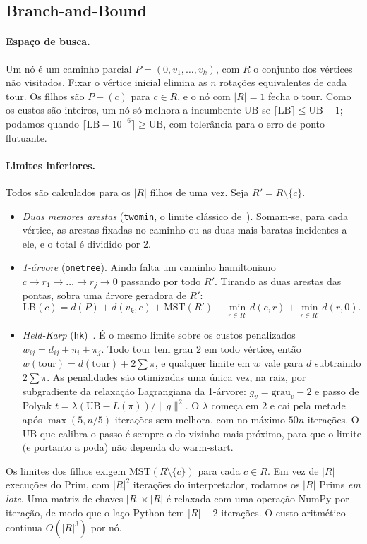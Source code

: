 \subsection{Branch-and-Bound}

\paragraph{Espaço de busca.} Um nó é um caminho parcial
$P=(0,v_1,\dots,v_k)$, com $R$ o conjunto dos vértices não visitados. Fixar o
vértice inicial elimina as $n$ rotações equivalentes de cada tour. Os filhos
são $P+(c)$ para $c\in R$, e o nó com $|R|=1$ fecha o tour. Como os custos
são inteiros, um nó só melhora a incumbente $\mathrm{UB}$ se
$\lceil \mathrm{LB}\rceil\le \mathrm{UB}-1$; podamos quando
$\lceil\mathrm{LB}-10^{-6}\rceil\ge\mathrm{UB}$, com tolerância para o erro
de ponto flutuante.

\paragraph{Limites inferiores.} Todos são calculados para os $|R|$ filhos de
uma vez. Seja $R'=R\setminus\{c\}$.
\begin{itemize}
  \item \emph{Duas menores arestas} (\texttt{twomin}, o limite clássico
    de~\cite{levitin2012}). Somam-se, para cada vértice, as arestas fixadas
    no caminho ou as duas mais baratas incidentes a ele, e o total é dividido
    por 2.
  \item \emph{1-árvore} (\texttt{onetree}). Ainda falta um caminho
    hamiltoniano $c\to r_1\to\dots\to r_j\to 0$ passando por todo $R'$.
    Tirando as duas arestas das pontas, sobra uma árvore geradora de $R'$:
    \[
      \mathrm{LB}(c)=d(P)+d(v_k,c)+\mathrm{MST}(R')
      +\min_{r\in R'} d(c,r)+\min_{r\in R'} d(r,0).
    \]
  \item \emph{Held-Karp} (\texttt{hk})~\cite{heldkarp1970,heldkarp1971}. É o
    mesmo limite sobre os custos penalizados $w_{ij}=d_{ij}+\pi_i+\pi_j$.
    Todo tour tem grau 2 em todo vértice, então
    $w(\text{tour})=d(\text{tour})+2\sum\pi$, e qualquer limite em $w$ vale
    para $d$ subtraindo $2\sum\pi$. As penalidades são otimizadas uma única
    vez, na raiz, por subgradiente da relaxação Lagrangiana da 1-árvore:
    $g_v=\mathrm{grau}_v-2$ e passo de Polyak
    $t=\lambda(\mathrm{UB}-L(\pi))/\lVert g\rVert^2$. O $\lambda$ começa em 2
    e cai pela metade após $\max(5,n/5)$ iterações sem melhora, com no máximo
    $50n$ iterações. O UB que calibra o passo é sempre o do vizinho mais
    próximo, para que o limite (e portanto a poda) não dependa do warm-start.
\end{itemize}
Os limites dos filhos exigem $\mathrm{MST}(R\setminus\{c\})$ para cada
$c\in R$. Em vez de $|R|$ execuções do Prim, com $|R|^2$ iterações do
interpretador, rodamos os $|R|$ Prims \emph{em lote}. Uma matriz de chaves
$|R|\times|R|$ é relaxada com uma operação NumPy por iteração, de modo que o
laço Python tem $|R|-2$ iterações. O custo aritmético continua
$O(|R|^3)$ por nó.

